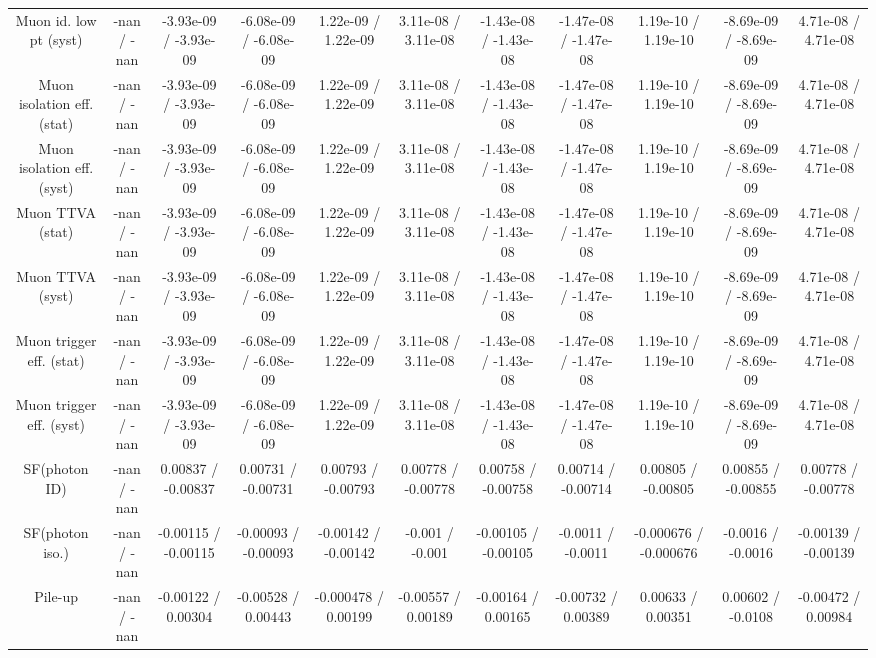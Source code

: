 \begin{table}[htbp]
\begin{center}
\begin{tabular}{|c|c|c|c|c|c|c|c|c|c|c|}
  Muon id. low pt (syst) & -nan / -nan & -3.93e-09 / -3.93e-09 & -6.08e-09 / -6.08e-09 & 1.22e-09 / 1.22e-09 & 3.11e-08 / 3.11e-08 & -1.43e-08 / -1.43e-08 & -1.47e-08 / -1.47e-08 & 1.19e-10 / 1.19e-10 & -8.69e-09 / -8.69e-09 & 4.71e-08 / 4.71e-08 \\ 
  Muon isolation eff. (stat) & -nan / -nan & -3.93e-09 / -3.93e-09 & -6.08e-09 / -6.08e-09 & 1.22e-09 / 1.22e-09 & 3.11e-08 / 3.11e-08 & -1.43e-08 / -1.43e-08 & -1.47e-08 / -1.47e-08 & 1.19e-10 / 1.19e-10 & -8.69e-09 / -8.69e-09 & 4.71e-08 / 4.71e-08 \\ 
  Muon isolation eff. (syst) & -nan / -nan & -3.93e-09 / -3.93e-09 & -6.08e-09 / -6.08e-09 & 1.22e-09 / 1.22e-09 & 3.11e-08 / 3.11e-08 & -1.43e-08 / -1.43e-08 & -1.47e-08 / -1.47e-08 & 1.19e-10 / 1.19e-10 & -8.69e-09 / -8.69e-09 & 4.71e-08 / 4.71e-08 \\ 
  Muon TTVA (stat) & -nan / -nan & -3.93e-09 / -3.93e-09 & -6.08e-09 / -6.08e-09 & 1.22e-09 / 1.22e-09 & 3.11e-08 / 3.11e-08 & -1.43e-08 / -1.43e-08 & -1.47e-08 / -1.47e-08 & 1.19e-10 / 1.19e-10 & -8.69e-09 / -8.69e-09 & 4.71e-08 / 4.71e-08 \\ 
  Muon TTVA (syst) & -nan / -nan & -3.93e-09 / -3.93e-09 & -6.08e-09 / -6.08e-09 & 1.22e-09 / 1.22e-09 & 3.11e-08 / 3.11e-08 & -1.43e-08 / -1.43e-08 & -1.47e-08 / -1.47e-08 & 1.19e-10 / 1.19e-10 & -8.69e-09 / -8.69e-09 & 4.71e-08 / 4.71e-08 \\ 
  Muon trigger eff. (stat) & -nan / -nan & -3.93e-09 / -3.93e-09 & -6.08e-09 / -6.08e-09 & 1.22e-09 / 1.22e-09 & 3.11e-08 / 3.11e-08 & -1.43e-08 / -1.43e-08 & -1.47e-08 / -1.47e-08 & 1.19e-10 / 1.19e-10 & -8.69e-09 / -8.69e-09 & 4.71e-08 / 4.71e-08 \\ 
  Muon trigger eff. (syst) & -nan / -nan & -3.93e-09 / -3.93e-09 & -6.08e-09 / -6.08e-09 & 1.22e-09 / 1.22e-09 & 3.11e-08 / 3.11e-08 & -1.43e-08 / -1.43e-08 & -1.47e-08 / -1.47e-08 & 1.19e-10 / 1.19e-10 & -8.69e-09 / -8.69e-09 & 4.71e-08 / 4.71e-08 \\ 
  SF(photon ID) & -nan / -nan & 0.00837 / -0.00837 & 0.00731 / -0.00731 & 0.00793 / -0.00793 & 0.00778 / -0.00778 & 0.00758 / -0.00758 & 0.00714 / -0.00714 & 0.00805 / -0.00805 & 0.00855 / -0.00855 & 0.00778 / -0.00778 \\ 
  SF(photon iso.) & -nan / -nan & -0.00115 / -0.00115 & -0.00093 / -0.00093 & -0.00142 / -0.00142 & -0.001 / -0.001 & -0.00105 / -0.00105 & -0.0011 / -0.0011 & -0.000676 / -0.000676 & -0.0016 / -0.0016 & -0.00139 / -0.00139 \\ 
  Pile-up & -nan / -nan & -0.00122 / 0.00304 & -0.00528 / 0.00443 & -0.000478 / 0.00199 & -0.00557 / 0.00189 & -0.00164 / 0.00165 & -0.00732 / 0.00389 & 0.00633 / 0.00351 & 0.00602 / -0.0108 & -0.00472 / 0.00984 \\ 

\end{tabular}
\end{center}
\end{table}

